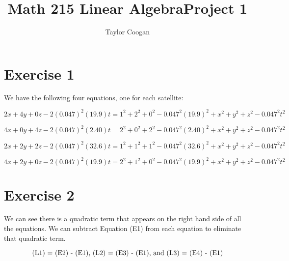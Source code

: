 \documentclass{article}
\begin{document}
\title{Math 215 Linear Algebra\break Project 1}
\author{Taylor Coogan}

\maketitle


\section*{Exercise 1}
We have the following four equations, one for each satellite:

\begin{equation}
    \label{equation 1}
    2x + 4y + 0z - 2(0.047)^{2}(19.9)t = 
        1^{2} + 2^{2} + 0^{2} - 0.047^{2}(19.9)^{2} + x^{2} + y^{2} + z^{2} - 0.047^{2}t^{2}  \tag{E1}
\end{equation}

\begin{equation}
    \label{equation 2}
    4x + 0y + 4z - 2(0.047)^{2}(2.40)t = 
        2^{2} + 0^{2} + 2^{2} - 0.047^{2}(2.40)^{2} + x^{2} + y^{2} + z^{2} - 0.047^{2}t^{2} \tag{E2}
\end{equation}

\begin{equation}
    \label{equation 3}
    2x + 2y + 2z - 2(0.047)^{2}(32.6)t = 
        1^{2} + 1^{2} + 1^{2} - 0.047^{2}(32.6)^{2} + x^{2} + y^{2} + z^{2} - 0.047^{2}t^{2}  \tag{E3}
\end{equation}

\begin{equation}
    \label{equation 4}
    4x + 2y + 0z - 2(0.047)^{2}(19.9)t = 
        2^{2} + 1^{2} + 0^{2} - 0.047^{2}(19.9)^{2} + x^{2} + y^{2} + z^{2} - 0.047^{2}t^{2}  \tag{E4}
\end{equation}


\section*{Exercise 2}
We can see there is a quadratic term that appears on the right hand side of all the equations.  We can subtract Equation (E1) from each equation to eliminate that quadratic term.  

\begin{equation*}
    \label{description}
    \textnormal{(L1) = (E2) - (E1), (L2) = (E3) - (E1), 
and (L3) = (E4) - (E1)} 
\end{equation*}
\end{document}
